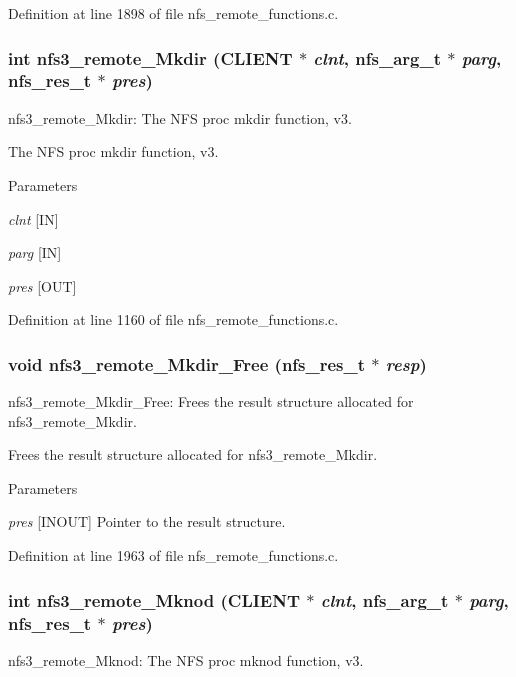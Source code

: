 Definition at line 1898 of file nfs\_\-remote\_\-functions.c.
\subsubsection[{nfs3\_\-remote\_\-Mkdir}]{\setlength{\rightskip}{0pt plus 5cm}int nfs3\_\-remote\_\-Mkdir (CLIENT $\ast$ {\em clnt}, \/  nfs\_\-arg\_\-t $\ast$ {\em parg}, \/  nfs\_\-res\_\-t $\ast$ {\em pres})}\label{group__NFSprocs_ga087b36e270a15c89a9b8327448a774b9}
nfs3\_\-remote\_\-Mkdir: The NFS proc mkdir function, v3.

The NFS proc mkdir function, v3.


\begin{DoxyParams}{Parameters}
\item[{\em clnt}][IN] \item[{\em parg}][IN] \item[{\em pres}][OUT] \end{DoxyParams}


Definition at line 1160 of file nfs\_\-remote\_\-functions.c.
\subsubsection[{nfs3\_\-remote\_\-Mkdir\_\-Free}]{\setlength{\rightskip}{0pt plus 5cm}void nfs3\_\-remote\_\-Mkdir\_\-Free (nfs\_\-res\_\-t $\ast$ {\em resp})}\label{group__NFSprocs_gaba4b922b6e1007dc9bafff5271184dfa}
nfs3\_\-remote\_\-Mkdir\_\-Free: Frees the result structure allocated for nfs3\_\-remote\_\-Mkdir.

Frees the result structure allocated for nfs3\_\-remote\_\-Mkdir.


\begin{DoxyParams}{Parameters}
\item[{\em pres}][INOUT] Pointer to the result structure. \end{DoxyParams}


Definition at line 1963 of file nfs\_\-remote\_\-functions.c.
\subsubsection[{nfs3\_\-remote\_\-Mknod}]{\setlength{\rightskip}{0pt plus 5cm}int nfs3\_\-remote\_\-Mknod (CLIENT $\ast$ {\em clnt}, \/  nfs\_\-arg\_\-t $\ast$ {\em parg}, \/  nfs\_\-res\_\-t $\ast$ {\em pres})}\label{group__NFSprocs_ga39ac31f6265cf508006d1def33d06c70}
nfs3\_\-remote\_\-Mknod: The NFS proc mknod function, v3.

